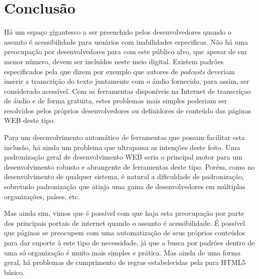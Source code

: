 \documentclass[
	12pt,				%
	oneside,			%
	a4paper,			%
	english,			%
	brazil				%
	]{abntex2ppgsi}
\begin{document}
\chapter{Conclusão}

Há um espaço gigantesco a ser preenchido pelos desenvolvedores quando o assunto é acessibilidade para usuários com inabilidades especificas. Não há uma preocupação por desenvolvedores para com este público alvo, que apesar de em menor número, devem ser incluídos neste meio digital. Existem padrões especificados pela  que dizem por exemplo que autores de \textit{podcasts} deveriam inserir a transcrição do texto juntamente com o áudio fornecido, para assim, ser considerado acessível. Com as ferramentas disponíveis na Internet de transcriçao de áudio e de forma gratuita, estes problemas mais simples poderiam ser resolvidos pelos próprios desenvolvedores ou definidores de conteúdo das páginas WEB deste tipo.

Para um desenvolvimento automático de ferramentas que possam facilitar esta inclusão, há ainda um problema que ultrapassa as intenções deste feito. Uma padronização geral de desenvolvimento WEB seria o principal motor para um desenvolvimento robusto e abrangente de ferramentas deste tipo. Porém, como no desenvolvimento de qualquer sistema, é natural a dificuldade de padronização, sobretudo padronização que atinja uma gama de desenvolvedores em múltiplas organizações, países, etc. 

Mas ainda sim, vimos que é possível com que haja esta preocupação por parte dos principais portais de internet quando o assunto é acessibilidade. É possível que páginas se preocupem com uma automatização de seus próprios conteúdos para dar suporte à este tipo de necessidade, já que a busca por padrões dentro de uma só organização é muito mais simples e prática. Mas ainda de uma forma geral, há problemas de cumprimento de regras estabelecidas pela  para HTML5 básico. 


\postextual




\end{document}
